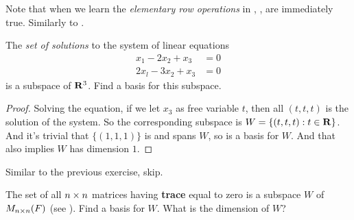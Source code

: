 \begin{note}
Note that when we learn the \emph{elementary row operations} in , ,  are immediately true.
Similarly to .
\end{note}

\begin{exercise} \label{exercise 1.6.13}
The \emph{set of solutions} to the system of linear equations
\begin{align*}
       x_1 - 2x_2 + x_3 & = 0 \\
      2x_l - 3x_2 + x_3 & = 0
\end{align*}
is a subspace of \(\mathbf{R}^3\).
Find a basis for this subspace.
\end{exercise}

\begin{proof}
Solving the equation, if we let \(x_3\) as free variable \(t\), then all \((t, t, t)\) is the solution of the system.
So the corresponding subspace is \(W = \{ (t, t, t) : t \in \mathbf{R} \}\).
And it's trivial that \(\{ (1, 1, 1) \}\) is \LID{} and spans \(W\), so is a basis for \(W\).
And that also implies \(W\) has dimension \(1\).
\end{proof}

\begin{exercise} \label{exercise 1.6.14}
Similar to the previous exercise, skip.
\end{exercise}

\begin{exercise} \label{exercise 1.6.15}
The set of all \(n \times n\) matrices having \textbf{trace} equal to zero is a subspace \(W\) of \(M_{n \times n}(F)\) (see ).
Find a basis for \(W\).
What is the dimension of \(W\)?
\end{exercise}

